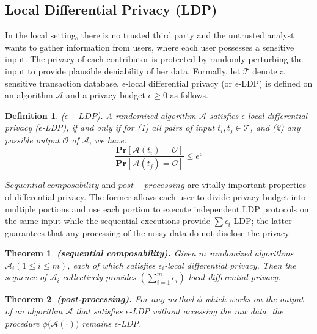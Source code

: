 \documentclass[conference]{IEEEtran}
\newtheorem{theorem}{\bf Theorem}[section]
\newtheorem{Definition}{\bf Definition}
\begin{document}
\subsection{Local Differential Privacy (LDP)}
In the local setting, there is no trusted third party and the untrusted analyst wants to gather information from users, where each user possesses a sensitive input. The privacy of each contributor is protected by randomly perturbing the input to provide plausible deniability of her data. Formally, let $\mathcal{T}$ denote a sensitive transaction database. $\epsilon$-local differential privacy (or $\epsilon$-LDP) is defined on an algorithm $\mathcal{A}$ and a privacy budget $\epsilon \geq 0$ as follows.
\begin{Definition}
($\epsilon-LDP$). A randomized algorithm $\mathcal{A}$ satisfies $\epsilon$-local differential privacy ($\epsilon$-LDP), if and only if for (1) all pairs of input $t_i,t_j \in \mathcal{T}$, and (2) any possible output $\mathcal{O}$ of $\mathcal{A}$, we have:\\
$$\frac{\mathbf{Pr}[\mathcal{A}(t_i)=\mathcal{O}]}{\mathbf{Pr}[\mathcal{A}(t_j)=\mathcal{O}]} \leq e^{\epsilon}$$
\end{Definition}

$Sequential\  composability$\cite{a9} and $post-processing$\cite{post-processing} are vitally important properties of differential privacy. The former allows each user to divide privacy budget into multiple portions and use each portion to execute independent LDP protocols on the same input while the sequential executions provide $\sum \epsilon_i$-LDP; the latter guarantees that any processing of the noisy data do not disclose the privacy.

\begin{theorem}\label{sequential composability}
\textbf{(sequential composability).} Given $m$ randomized algorithms $\mathcal{A}_i(1 \leq i \leq m)$, each of which satisfies $\epsilon_i$-local differential privacy. Then the sequence of $\mathcal{A}_i$ collectively provides $(\sum_{i=1}^{m} \epsilon_i)$-local differential privacy. 
\end{theorem}

\begin{theorem}\label{post processing}
\textbf{(post-processing).} For any method $\phi$ which works on the output of an algorithm $\mathcal{A}$ that satisfies $\epsilon$-LDP without accessing the raw data, the procedure $\phi \big(\mathcal{A(\cdot)} \big)$ remains $\epsilon$-LDP.
\end{theorem}
\end{document}
